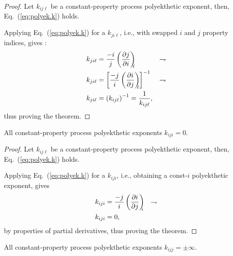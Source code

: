     \begin{proof}
        Let  $k_{ij\ell}$  be  a  constant-property   process   polyekthetic   exponent,   then,
        Eq.~(\ref{eq:polyek.k}) holds.

        Applying Eq.~(\ref{eq:polyek.k}) for a $k_{ji\ell}$, i.e.,  with  swapped  $i$  and  $j$
        property indices, gives :
        \begin{align}
            k_{ji\ell} &= \frac{-i}{j} \left(\frac{\partial {{j}}}{\partial {{i}}}\right)_{\!\!\!{\ell}}
                       & \rightharpoondown\\
            k_{ji\ell} &= \left[\frac{-j}{i} \left(\frac{\partial {{i}}}{\partial {{j}}}\right)_{\!\!\!{\ell}}\right]^{-1}
                       & \rightharpoondown\\
            k_{ji\ell} &= \left(k_{ij\ell}\right)^{-1} = \frac{1}{k_{ij\ell}},
        \end{align}
        \noindent thus proving the theorem.
    \end{proof}

    \begin{theorem}\label{the:k.consti}
        All constant-property process polyekthetic exponents $k_{iji} = 0$.
    \end{theorem}

    \begin{proof}
        Let  $k_{ij\ell}$  be  a  constant-property   process   polyekthetic   exponent,   then,
        Eq.~(\ref{eq:polyek.k}) holds.

        Applying  Eq.~(\ref{eq:polyek.k})  for  a  $k_{iji}$,  i.e.,   obtaining   a   const-$i$
        polyekthetic exponent, gives
        \begin{align}
            k_{iji} &= \frac{-j}{i} \left(\frac{\partial {{i}}}{\partial {{j}}}\right)_{\!\!\!{i}}
                    & \rightharpoondown\\
            k_{iji} &= 0,
        \end{align}
        \noindent by properties of partial derivatives, thus proving the theorem.
    \end{proof}

    \begin{theorem}\label{the:k.constj}
        All constant-property process polyekthetic exponents $k_{ijj} = \pm\infty$.
    \end{theorem}

